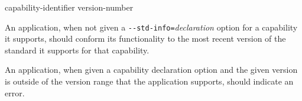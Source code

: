 \begin{bnf}

\br
	capability-identifier \terminal{=} version-number

\end{bnf}

\pnum
An application, when not given a \verb|--std-info=|\emph{declaration} option for
a capability it supports, should conform its functionality to the most recent
version of the standard it supports for that capability.

\pnum
An application, when given a capability declaration option and the given
version is outside of the version range that the application supports, should
indicate an error.

